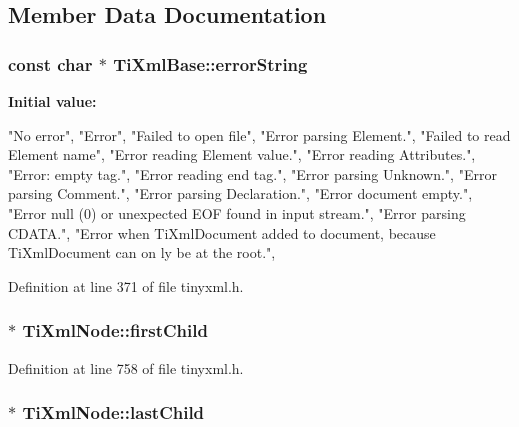 \subsection{Member Data Documentation}
\hypertarget{classTiXmlBase_a7ac8feec4100e446b3d78e1ac0659700}{
\subsubsection[{errorString}]{\setlength{\rightskip}{0pt plus 5cm}const char $\ast$ {\bf TiXmlBase::errorString}}}
\label{d8/d47/classTiXmlBase_a7ac8feec4100e446b3d78e1ac0659700}
{\bfseries Initial value:}
\begin{DoxyCode}

{
        "No error",
        "Error",
        "Failed to open file",
        "Error parsing Element.",
        "Failed to read Element name",
        "Error reading Element value.",
        "Error reading Attributes.",
        "Error: empty tag.",
        "Error reading end tag.",
        "Error parsing Unknown.",
        "Error parsing Comment.",
        "Error parsing Declaration.",
        "Error document empty.",
        "Error null (0) or unexpected EOF found in input stream.",
        "Error parsing CDATA.",
        "Error when TiXmlDocument added to document, because TiXmlDocument can on
      ly be at the root.",
}
\end{DoxyCode}


Definition at line 371 of file tinyxml.h.

\hypertarget{classTiXmlNode_af749fb7f22010b80e8f904c32653d50e}{
\subsubsection[{firstChild}]{$\ast$ {\bf TiXmlNode::firstChild}}}
\label{d3/dd5/classTiXmlNode_af749fb7f22010b80e8f904c32653d50e}


Definition at line 758 of file tinyxml.h.

\hypertarget{classTiXmlNode_a5b30756d21b304580d22a841ec9d61f8}{
\subsubsection[{lastChild}]{$\ast$ {\bf TiXmlNode::lastChild}}}
\label{d3/dd5/classTiXmlNode_a5b30756d21b304580d22a841ec9d61f8}


